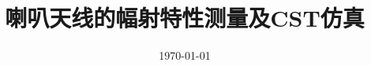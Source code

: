 \documentclass{../source/Experiment}
\title{喇叭天线的幅射特性测量及CST仿真}
\date{\today}
\begin{document}
    \makecover
\end{document}
